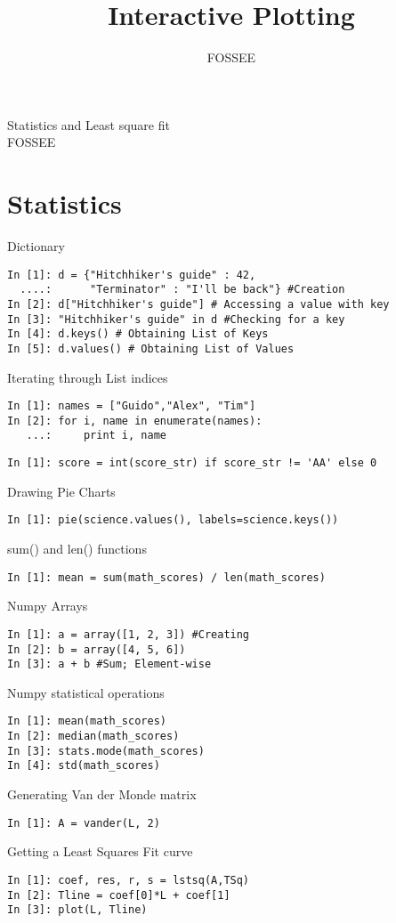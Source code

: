\documentclass[12pt]{article}
\title{Interactive Plotting}
\author{FOSSEE}
\begin{document}
\date{}
\vspace{-1in}
\begin{center}
\LARGE{Statistics and Least square fit}\\
\large{FOSSEE}
\end{center}
\section{Statistics}
Dictionary
\begin{verbatim}
In [1]: d = {"Hitchhiker's guide" : 42, 
  ....:      "Terminator" : "I'll be back"} #Creation
In [2]: d["Hitchhiker's guide"] # Accessing a value with key
In [3]: "Hitchhiker's guide" in d #Checking for a key
In [4]: d.keys() # Obtaining List of Keys
In [5]: d.values() # Obtaining List of Values
\end{verbatim}
Iterating through List indices
\begin{verbatim}
In [1]: names = ["Guido","Alex", "Tim"]
In [2]: for i, name in enumerate(names):
   ...:     print i, name
\end{verbatim}

\begin{verbatim}
In [1]: score = int(score_str) if score_str != 'AA' else 0
\end{verbatim}
Drawing Pie Charts
\begin{verbatim}
In [1]: pie(science.values(), labels=science.keys())
\end{verbatim}
sum() and len() functions
\begin{verbatim}
In [1]: mean = sum(math_scores) / len(math_scores)
\end{verbatim}
Numpy Arrays
\begin{verbatim}
In [1]: a = array([1, 2, 3]) #Creating
In [2]: b = array([4, 5, 6])
In [3]: a + b #Sum; Element-wise
\end{verbatim}
Numpy statistical operations 
\begin{verbatim}
In [1]: mean(math_scores)
In [2]: median(math_scores)
In [3]: stats.mode(math_scores)
In [4]: std(math_scores)
\end{verbatim}
Generating Van der Monde matrix
\begin{verbatim}
In [1]: A = vander(L, 2)
\end{verbatim}
Getting a Least Squares Fit curve
\begin{verbatim}
In [1]: coef, res, r, s = lstsq(A,TSq)
In [2]: Tline = coef[0]*L + coef[1]
In [3]: plot(L, Tline)
\end{verbatim}
\end{document}
